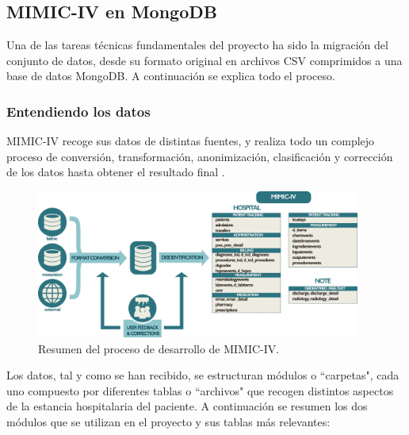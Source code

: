 \subsection{MIMIC-IV en MongoDB}


Una de las tareas técnicas fundamentales del proyecto ha sido la migración del conjunto de datos, desde su formato original en archivos CSV comprimidos a una base de datos MongoDB. A continuación se explica todo el proceso.

\subsubsection{Entendiendo los datos}

MIMIC-IV recoge sus datos de distintas fuentes, y realiza todo un complejo proceso de conversión, transformación, anonimización, clasificación y corrección de los datos hasta obtener el resultado final \cite{MIMICIV_paper}.

\begin{figure}[H]
    \centering
    \includegraphics[width=0.95\textwidth]{imagenes/desarrolloMIMIC-IV.png}
    \caption{Resumen del proceso de desarrollo de MIMIC-IV.}
    \label{fig:desarrollo_mimiciv}
\end{figure}


Los datos, tal y como se han recibido, se estructuran módulos o ``carpetas", cada uno compuesto por diferentes tablas o ``archivos" que recogen distintos aspectos de la estancia hospitalaria del paciente. A continuación se resumen los dos módulos que se utilizan en el proyecto y sus tablas más relevantes:

